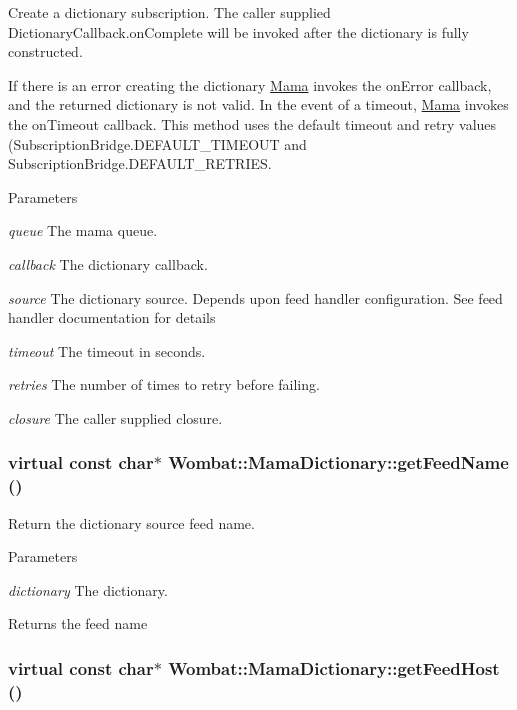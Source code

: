 Create a dictionary subscription. The caller supplied {\ttfamily DictionaryCallback.onComplete} will be invoked after the dictionary is fully constructed.

If there is an error creating the dictionary \hyperlink{classWombat_1_1Mama}{Mama} invokes the {\ttfamily onError} callback, and the returned dictionary is not valid. In the event of a timeout, \hyperlink{classWombat_1_1Mama}{Mama} invokes the {\ttfamily onTimeout} callback. This method uses the default timeout and retry values ({\ttfamily SubscriptionBridge.DEFAULT\_\-TIMEOUT} and {\ttfamily SubscriptionBridge.DEFAULT\_\-RETRIES}.


\begin{DoxyParams}{Parameters}
\item[{\em queue}]The mama queue. \item[{\em callback}]The dictionary callback. \item[{\em source}]The dictionary source. Depends upon feed handler configuration. See feed handler documentation for details \item[{\em timeout}]The timeout in seconds. \item[{\em retries}]The number of times to retry before failing. \item[{\em closure}]The caller supplied closure. \end{DoxyParams}
\hypertarget{classWombat_1_1MamaDictionary_a18529fcf91c4ff0a63b889d4d60e477c}{
\subsubsection[{getFeedName}]{\setlength{\rightskip}{0pt plus 5cm}virtual const char$\ast$ Wombat::MamaDictionary::getFeedName ()}}
\label{classWombat_1_1MamaDictionary_a18529fcf91c4ff0a63b889d4d60e477c}


Return the dictionary source feed name. 
\begin{DoxyParams}{Parameters}
\item[{\em dictionary}]The dictionary. \end{DoxyParams}
\begin{DoxyReturn}{Returns}
the feed name 
\end{DoxyReturn}
\hypertarget{classWombat_1_1MamaDictionary_afd4f16c61e5596589a13954386ee8f34}{
\subsubsection[{getFeedHost}]{\setlength{\rightskip}{0pt plus 5cm}virtual const char$\ast$ Wombat::MamaDictionary::getFeedHost ()}}
\label{classWombat_1_1MamaDictionary_afd4f16c61e5596589a13954386ee8f34}


